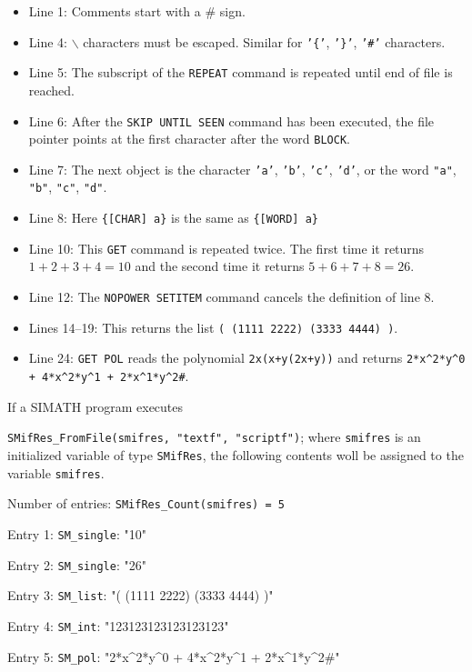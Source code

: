 \documentclass{article}
\begin{document}
\begin{itemize}
\item Line 1: Comments start with a \# sign.
\item Line 4: $\backslash$ characters must be escaped. Similar for
  \texttt{'\{'}, \texttt{'\}'}, \texttt{'\#'} characters.
\item Line 5: The subscript of the \texttt{REPEAT} command is repeated
  until end of file is reached.
\item Line 6: After the \texttt{SKIP UNTIL SEEN} command has been
  executed, the file pointer points at the first character after the
  word \texttt{BLOCK}.
\item Line 7: The next object is the character \texttt{'a'},
  \texttt{'b'}, \texttt{'c'}, \texttt{'d'}, or the word \texttt{"a"},
  \texttt{"b"}, \texttt{"c"}, \texttt{"d"}.
\item Line 8: Here \texttt{\{[CHAR] a\}} is the same as
  \texttt{\{[WORD] a\}}
\item Line 10: This \texttt{GET} command is repeated twice. The first
  time it returns $1+2+3+4 = 10$ and the second time it returns
  $5+6+7+8 = 26$.
\item Line 12: The \texttt{NOPOWER SETITEM} command cancels the
  definition of line 8.
\item Lines 14--19: This returns the list \texttt{( (1111 2222) (3333
    4444) )}.
\item Line 24: \texttt{GET POL} reads the polynomial
  \texttt{2x(x+y(2x+y))} and returns \texttt{2*x\^{}2*y\^{}0 +
    4*x\^{}2*y\^{}1 + 2*x\^{}1*y\^{}2\#}.
\end{itemize}

If a SIMATH program executes

\texttt{SMifRes\_FromFile(smifres, "textf", "scriptf")}; where
\texttt{smifres} is an initialized variable of type \texttt{SMifRes},
the following contents woll be assigned to the variable
\texttt{smifres}.

Number of entries: \texttt{SMifRes\_Count(smifres) = 5}

Entry 1: \texttt{SM\_single}: "10"

Entry 2: \texttt{SM\_single}: "26"

Entry 3: \texttt{SM\_list}: "( (1111 2222) (3333 4444) )"

Entry 4: \texttt{SM\_int}: "123123123123123123"

Entry 5: \texttt{SM\_pol}: "2*x\^{}2*y\^{}0 + 4*x\^{}2*y\^{}1 +
2*x\^{}1*y\^{}2\#"
\end{document}
